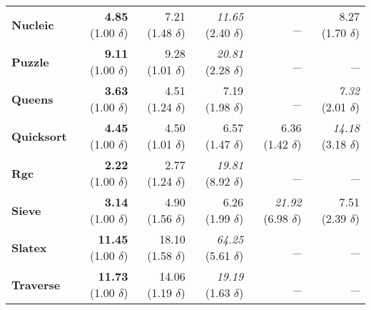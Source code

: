 \begin{tabular}{|l|r|r|r|r|r|}
{\textbf{Nucleic}} & {\textbf{4.85}}  (1.00  $\delta$) & 7.21  (1.48  $\delta$) & {\textit{11.65}}  (2.40  $\delta$) & \_ & 8.27  (1.70  $\delta$) \\
{\textbf{Puzzle}} & {\textbf{9.11}}  (1.00  $\delta$) & 9.28  (1.01  $\delta$) & {\textit{20.81}}  (2.28  $\delta$) & \_ & \_\\
{\textbf{Queens}} & {\textbf{3.63}}  (1.00  $\delta$) & 4.51  (1.24  $\delta$) & 7.19  (1.98  $\delta$) & \_ & {\textit{7.32}}  (2.01  $\delta$) \\
{\textbf{Quicksort}} & {\textbf{4.45}}  (1.00  $\delta$) & 4.50  (1.01  $\delta$) & 6.57  (1.47  $\delta$) & 6.36  (1.42  $\delta$) & {\textit{14.18}}  (3.18  $\delta$) \\
{\textbf{Rgc}} & {\textbf{2.22}}  (1.00  $\delta$) & 2.77  (1.24  $\delta$) & {\textit{19.81}}  (8.92  $\delta$) & \_ & \_\\
{\textbf{Sieve}} & {\textbf{3.14}}  (1.00  $\delta$) & 4.90  (1.56  $\delta$) & 6.26  (1.99  $\delta$) & {\textit{21.92}}  (6.98  $\delta$) & 7.51  (2.39  $\delta$) \\
{\textbf{Slatex}} & {\textbf{11.45}}  (1.00  $\delta$) & 18.10  (1.58  $\delta$) & {\textit{64.25}}  (5.61  $\delta$) & \_ & \_\\
{\textbf{Traverse}} & {\textbf{11.73}}  (1.00  $\delta$) & 14.06  (1.19  $\delta$) & {\textit{19.19}}  (1.63  $\delta$) & \_ & \_\\
\hline
\end{tabular}


